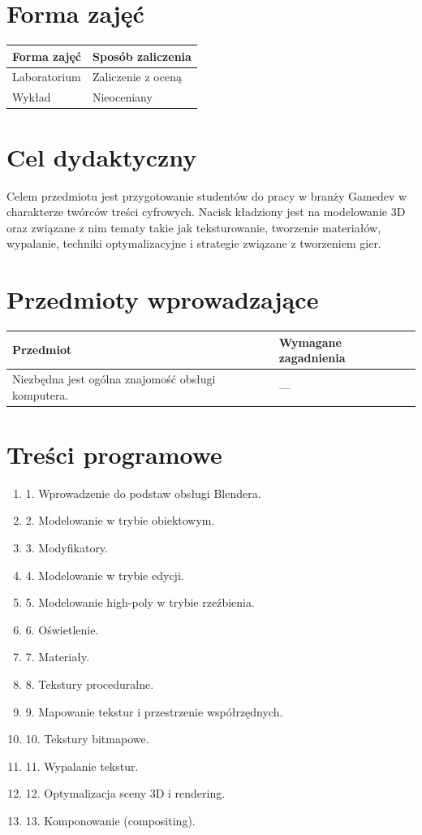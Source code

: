 \documentclass[12pt, a4paper]{article}
\begin{document}
\section{Forma zajęć}

\begin{tabular}{ll}
  \hline
  \textbf{Forma zajęć} & \textbf{Sposób zaliczenia} \\
  \hline
  Laboratorium & Zaliczenie z oceną \\
  Wykład & Nieoceniany \\
  \hline
\end{tabular}

\section{Cel dydaktyczny}

Celem przedmiotu jest przygotowanie studentów do pracy w branży Gamedev w charakterze twórców treści cyfrowych. Nacisk kładziony jest na modelowanie 3D oraz związane z nim tematy takie jak teksturowanie, tworzenie materiałów, wypalanie, techniki optymalizacyjne i strategie związane z tworzeniem gier.

\section{Przedmioty wprowadzające}

\begin{tabularx}{\textwidth}{lX}
  \hline
  \textbf{Przedmiot} & \textbf{Wymagane zagadnienia} \\
  \hline
  Niezbędna jest ogólna znajomość obsługi komputera. & --- \\
  \hline
\end{tabularx}

\section{Treści programowe}

\begin{enumerate}
  \item 1. Wprowadzenie do podstaw obsługi Blendera.
  \item 2. Modelowanie w trybie obiektowym.
  \item 3. Modyfikatory.
  \item 4. Modelowanie w trybie edycji.
  \item 5. Modelowanie high-poly w trybie rzeźbienia.
  \item 6. Oświetlenie.
  \item 7. Materiały.
  \item 8. Tekstury proceduralne.
  \item 9. Mapowanie tekstur i przestrzenie współrzędnych.
  \item 10. Tekstury bitmapowe.
  \item 11. Wypalanie tekstur.
  \item 12. Optymalizacja sceny 3D i rendering.
  \item 13. Komponowanie (compositing).
\end{enumerate}
\end{document}
